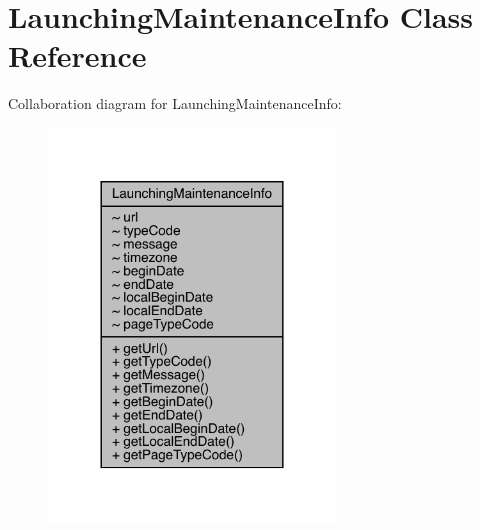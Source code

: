 \hypertarget{classcom_1_1toast_1_1android_1_1gamebase_1_1launching_1_1data_1_1_launching_maintenance_info}{}\section{Launching\+Maintenance\+Info Class Reference}
\label{classcom_1_1toast_1_1android_1_1gamebase_1_1launching_1_1data_1_1_launching_maintenance_info}


Collaboration diagram for Launching\+Maintenance\+Info\+:
\nopagebreak
\begin{figure}[H]
\begin{center}
\leavevmode
\includegraphics[width=216pt]{classcom_1_1toast_1_1android_1_1gamebase_1_1launching_1_1data_1_1_launching_maintenance_info__coll__graph}
\end{center}
\end{figure}
